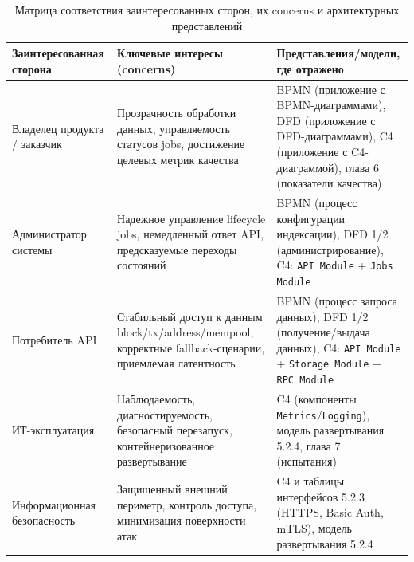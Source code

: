 ﻿\documentclass[14pt,a4paper]{extarticle}
\begin{document}
\begin{table}[H]
\centering
\begin{tabular}{p{} p{} p{}}
\toprule
Заинтересованная сторона & Ключевые интересы (concerns) & Представления/модели, где отражено \\
\midrule
Владелец продукта / заказчик & Прозрачность обработки данных, управляемость статусов jobs, достижение целевых метрик качества & BPMN (приложение с BPMN-диаграммами), DFD (приложение с DFD-диаграммами), C4 (приложение с C4-диаграммой), глава 6 (показатели качества) \\
\midrule
Администратор системы & Надежное управление lifecycle jobs, немедленный ответ API, предсказуемые переходы состояний & BPMN (процесс конфигурации индексации), DFD 1/2 (администрирование), C4: \texttt{API Module} + \texttt{Jobs Module} \\
\midrule
Потребитель API & Стабильный доступ к данным block/tx/address/mempool, корректные fallback-сценарии, приемлемая латентность & BPMN (процесс запроса данных), DFD 1/2 (получение/выдача данных), C4: \texttt{API Module} + \texttt{Storage Module} + \texttt{RPC Module} \\
\midrule
ИТ-эксплуатация & Наблюдаемость, диагностируемость, безопасный перезапуск, контейнеризованное развертывание & C4 (компоненты \texttt{Metrics}/\texttt{Logging}), модель развертывания 5.2.4, глава 7 (испытания) \\
\midrule
Информационная безопасность & Защищенный внешний периметр, контроль доступа, минимизация поверхности атак & C4 и таблицы интерфейсов 5.2.3 (HTTPS, Basic Auth, mTLS), модель развертывания 5.2.4 \\
\bottomrule
\end{tabular}
\caption{Матрица соответствия заинтересованных сторон, их concerns и архитектурных представлений}
\end{table}
\end{document}
